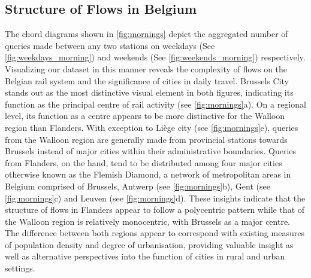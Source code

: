\documentclass{sig-alternate}
\begin{document}
\subsection{Structure of Flows in Belgium}

The chord diagrams shown in \cref{fig:mornings} depict the aggregated number of queries made between any two stations on weekdays (See \cref{fig:weekdays_morning}) and weekends (See \cref{fig:weekends_morning}) respectively. 
Visualizing our dataset in this manner reveals the complexity of flows on the Belgian rail system and the significance of cities in daily travel.
Brussels City stands out as the most distinctive visual element in both figures, indicating its function as the principal centre of rail activity (see \cref{fig:mornings}a).
On a regional level, its function as a centre appears to be more distinctive for the Walloon region than Flanders.
With exception to Liège city (see \cref{fig:mornings}e), queries from the Walloon region are generally made from provincial stations towards Brussels instead of major cities within their administrative boundaries. 
Queries from Flanders, on the hand, tend to be distributed among four major cities otherwise known as the Flemish Diamond, a network of metropolitan areas in Belgium comprised of Brussels, Antwerp (see \cref{fig:mornings}b), Gent (see \cref{fig:mornings}c) and Leuven (see \cref{fig:mornings}d). 
These insights indicate that the structure of flows in Flanders appear to follow a polycentric pattern while that of the Walloon region is relatively monocentric, with Brussels as a major centre.
The difference between both regions appear to correspond with existing measures of population density and degree of urbanisation, providing valuable insight as well as alternative perspectives into the function of cities in rural and urban settings.
\end{document}
